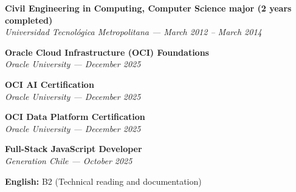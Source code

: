 \documentclass[10pt,letterpaper]{article}
\begin{document}
\vspace{0.2cm}

\noindent \textbf{Civil Engineering in Computing, Computer Science major (2 years completed)} \\
\textit{Universidad Tecnológica Metropolitana — March 2012 – March 2014}

\vspace{0.4cm}

\vspace{0.3cm}

\noindent \textbf{Oracle Cloud Infrastructure (OCI) Foundations} \\
\textit{Oracle University — December 2025}

\vspace{0.2cm}

\noindent \textbf{OCI AI Certification} \\
\textit{Oracle University — December 2025}

\vspace{0.2cm}

\noindent \textbf{OCI Data Platform Certification} \\
\textit{Oracle University — December 2025}

\vspace{0.2cm}

\noindent \textbf{Full-Stack JavaScript Developer} \\
\textit{Generation Chile — October 2025}

\vspace{0.4cm}

\vspace{0.3cm}

\noindent \textbf{English:} B2 (Technical reading and documentation)
\end{document}
